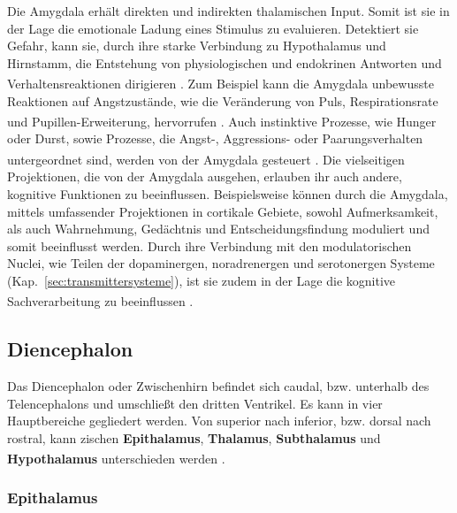 \documentclass[12pt,a4paper,pdftex]{article}
\begin{document}
\noindent Die Amygdala erhält direkten und indirekten thalamischen Input. Somit ist sie in der Lage die emotionale Ladung eines Stimulus zu evaluieren. Detektiert sie Gefahr, kann sie, durch ihre starke  Verbindung zu Hypothalamus und Hirnstamm, die Entstehung von physiologischen und endokrinen Antworten und Verhaltensreaktionen dirigieren \textsuperscript{\cite[48]{kandel2013principles}}. Zum Beispiel kann die Amygdala unbewusste Reaktionen auf Angstzustände, wie die Veränderung von Puls, Respirationsrate und Pupillen-Erweiterung,  hervorrufen \textsuperscript{\cite[15]{kandel2013principles}}.
Auch instinktive Prozesse, wie Hunger oder Durst, sowie Prozesse, die Angst-, Aggressions- oder Paarungsverhalten untergeordnet sind, werden von der Amygdala gesteuert \textsuperscript{\cite[18]{kandel2013principles}}.
Die vielseitigen Projektionen, die von der Amygdala ausgehen, erlauben ihr auch andere, kognitive Funktionen zu beeinflussen. Beispielsweise können durch die Amygdala, mittels umfassender Projektionen in cortikale Gebiete, sowohl Aufmerksamkeit, als auch Wahrnehmung, Gedächtnis und Entscheidungsfindung moduliert und somit beeinflusst werden. Durch ihre Verbindung mit den modulatorischen Nuclei, wie Teilen der dopaminergen, noradrenergen und serotonergen Systeme (Kap.~\ref{sec:transmittersysteme}), ist sie zudem in der Lage die kognitive Sachverarbeitung zu beeinflussen \textsuperscript{\cite[48]{kandel2013principles}}.


\subsection{Diencephalon}
\label{subsec:Diencephalon} 

Das Diencephalon oder Zwischenhirn befindet sich caudal, bzw. unterhalb des Telencephalons und umschließt den dritten Ventrikel. Es kann in vier Hauptbereiche gegliedert werden. Von superior nach inferior, bzw. dorsal nach rostral, kann zischen \textbf{Epithalamus}, \textbf{Thalamus}, \textbf{Subthalamus}  und \textbf{Hypothalamus} unterschieden werden \textsuperscript{\cite[16]{crossman2014neuroanatomy}}.

\subsubsection{Epithalamus}
\label{subsubsec:Epithalamus} 
\end{document}
